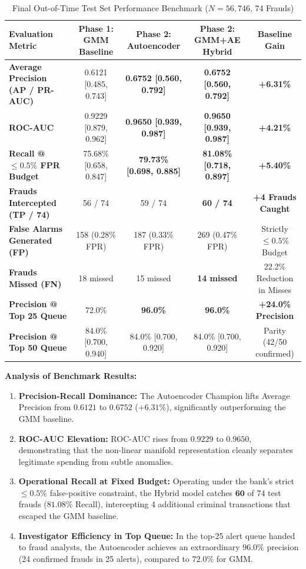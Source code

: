 \documentclass[10pt,journal,compsoc]{IEEEtran}
\begin{document}
\begin{table}[t]
\caption{Final Out-of-Time Test Set Performance Benchmark ($N=56,746$, 74 Frauds)}
\label{tab:test_benchmark}
\centering
\begin{tabular}{lcccc}
\toprule
\textbf{Evaluation Metric} & \textbf{Phase 1: GMM Baseline} & \textbf{Phase 2: Autoencoder} & \textbf{Phase 2: GMM+AE Hybrid} & \textbf{Baseline Gain} \\
\midrule
\textbf{Average Precision (AP / PR-AUC)} & 0.6121 [0.485, 0.743] & \textbf{0.6752 [0.560, 0.792]} & \textbf{0.6752 [0.560, 0.792]} & \textbf{+6.31\%} \\
\textbf{ROC-AUC}                         & 0.9229 [0.879, 0.962] & \textbf{0.9650 [0.939, 0.987]} & \textbf{0.9650 [0.939, 0.987]} & \textbf{+4.21\%} \\
\textbf{Recall @ $\le 0.5\%$ FPR Budget} & 75.68\% [0.658, 0.847] & \textbf{79.73\% [0.698, 0.885]} & \textbf{81.08\% [0.718, 0.897]} & \textbf{+5.40\%} \\
\textbf{Frauds Intercepted (TP / 74)}    & 56 / 74 & 59 / 74 & \textbf{60 / 74} & \textbf{+4 Frauds Caught} \\
\textbf{False Alarms Generated (FP)}    & 158 (0.28\% FPR) & 187 (0.33\% FPR) & 269 (0.47\% FPR) & Strictly $\le 0.5\%$ Budget \\
\textbf{Frauds Missed (FN)}              & 18 missed & 15 missed & \textbf{14 missed} & 22.2\% Reduction in Misses \\
\textbf{Precision @ Top 25 Queue}        & 72.0\% & \textbf{96.0\%} & \textbf{96.0\%} & \textbf{+24.0\% Precision} \\
\textbf{Precision @ Top 50 Queue}        & 84.0\% [0.700, 0.940] & 84.0\% [0.700, 0.920] & 84.0\% [0.700, 0.920] & Parity (42/50 confirmed) \\
\bottomrule
\end{tabular}
\end{table}

\textbf{Analysis of Benchmark Results:}
\begin{enumerate}
    \item \textbf{Precision-Recall Dominance:} The Autoencoder Champion lifts Average Precision from $0.6121$ to $\mathbf{0.6752}$ ($+6.31\%$), significantly outperforming the GMM baseline.
    \item \textbf{ROC-AUC Elevation:} ROC-AUC rises from $0.9229$ to $\mathbf{0.9650}$, demonstrating that the non-linear manifold representation cleanly separates legitimate spending from subtle anomalies.
    \item \textbf{Operational Recall at Fixed Budget:} Operating under the bank's strict $\le 0.5\%$ false-positive constraint, the Hybrid model catches $\mathbf{60}$ of $74$ test frauds ($81.08\%$ Recall), intercepting 4 additional criminal transactions that escaped the GMM baseline.
    \item \textbf{Investigator Efficiency in Top Queue:} In the top-25 alert queue handed to fraud analysts, the Autoencoder achieves an extraordinary $\mathbf{96.0\%}$ precision (24 confirmed frauds in 25 alerts), compared to $72.0\%$ for GMM.
\end{enumerate}
\end{document}
